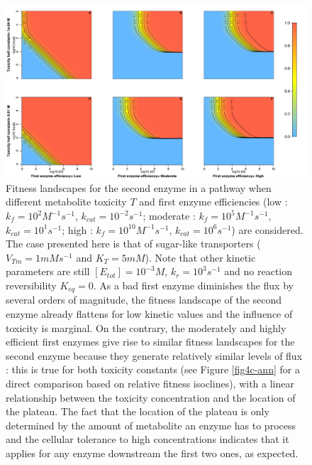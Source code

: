 \begin{figure}[htb!]
\centering
\includegraphics[scale=0.46,trim=0cm 0cm 0cm 0cm,clip]{pics/SM-Enzymes/2DFit_Landscape_2Enz_First_Enz_Influence&Tox.jpeg} 
\caption{Fitness landscapes for the second enzyme in a pathway when different metabolite toxicity $T$ and first enzyme efficiencies (low : $k_f=10^2 M^{-1}s^{-1}$, $k_{cat}=10^{-2}s^{-1}$; moderate : $k_f=10^5M^{-1}s^{-1}$, $k_{cat}=10^1s^{-1}$; high : $k_f=10^{10}M^{-1}s^{-1}$, $k_{cat}=10^6s^{-1}$) are considered. The case presented here is that of sugar-like transporters ($V_{Tm}=1mM s^{-1}$ and $K_T=5mM$). Note that other kinetic parameters are still $[E_{tot}]=10^{-3}M$, $k_r=10^3s^{-1}$ and no reaction reversibility $K_{eq} = 0$. As a bad first enzyme diminishes the flux by several orders of magnitude, the fitness landscape of the second enzyme already flattens for low kinetic values and the influence of toxicity is marginal. On the contrary, the moderately and highly efficient first enzymes give rise to similar fitness landscapes for the second enzyme because they generate relatively similar levels of flux : this is true for both toxicity constants (see Figure \ref{fig4c-ann} for a direct comparison based on relative fitness isoclines), with a linear relationship between the toxicity concentration and the location of the plateau. The fact that the location of the plateau is only determined by the amount of metabolite an enzyme has to process and the cellular tolerance to high concentrations indicates that it applies for any enzyme downstream the first two ones, as expected.}
\label{fig4b-ann}
\end{figure}

